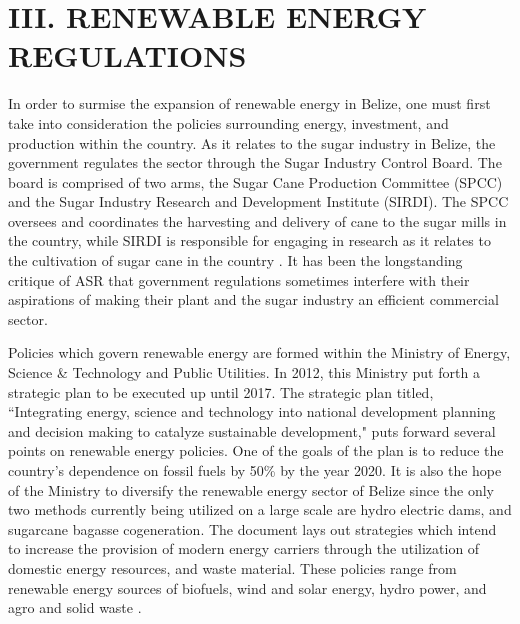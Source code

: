 \documentclass[twocolumn,10pt]{asme2e}
\begin{document}
\section*{III. RENEWABLE ENERGY REGULATIONS}
In order to surmise the expansion of renewable energy in Belize, one must first take into consideration the policies surrounding energy, investment, and production within the country. As it relates to the sugar industry in Belize, the government regulates the sector through the Sugar Industry Control Board. The board is comprised of two arms, the Sugar Cane Production Committee (SPCC) and the Sugar Industry Research and Development Institute (SIRDI). The SPCC oversees and coordinates the harvesting and delivery of cane to the sugar mills in the country, while SIRDI is responsible for engaging in research as it relates to the cultivation of sugar cane in the country \cite{imf_issues}. It has been the longstanding critique of ASR that government regulations sometimes interfere with their aspirations of making their plant and the sugar industry an efficient commercial sector.  

Policies which govern renewable energy are formed within the Ministry of Energy, Science \& Technology and Public Utilities. In 2012, this Ministry put forth a strategic plan to be executed up until 2017. The strategic plan titled, ``Integrating energy, science and technology into national development planning and decision making to catalyze sustainable development," puts forward several points on renewable energy policies. One of the goals of the plan is to reduce the country's dependence on fossil fuels by 50\% by the year 2020. It is also the hope of the Ministry to diversify the renewable energy sector of Belize since the only two methods currently being utilized on a large scale are hydro electric dams, and sugarcane bagasse cogeneration. The document lays out strategies which intend to increase the provision of modern energy carriers through the utilization of domestic energy resources, and waste material. These policies range from renewable energy sources of biofuels, wind and solar energy, hydro power, and agro and solid waste \cite{ministry_strat}.
\end{document}
